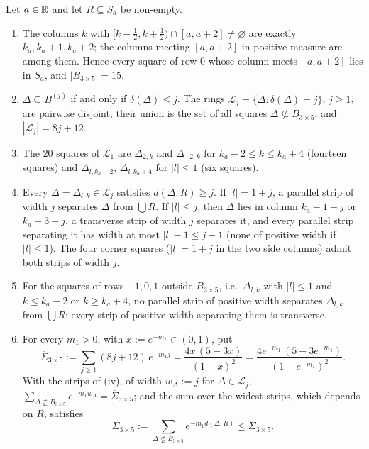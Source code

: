 \begin{auxlemma}\label{aux:notation-rings}
Let $a\in\mathbb{R}$ and let $R\subseteq S_a$ be non-empty.
\begin{enumerate}
\item[\textup{(i)}] The columns $k$ with $[k-\frac12,k+\frac12)\cap[a,a+2]\ne\varnothing$ are
exactly $k_a,k_a+1,k_a+2$; the columns meeting $[a,a+2]$ in positive measure are among
them.  Hence every square of row $0$ whose column meets $[a,a+2]$ lies in $S_a$, and
$|B_{3\times5}|=15$.
\item[\textup{(ii)}] $\Delta\subseteq B^{(j)}$ if and only if $\delta(\Delta)\le j$.  The rings
$\mathcal L_j=\{\Delta:\delta(\Delta)=j\}$, $j\ge1$, are pairwise disjoint, their union is
the set of all squares $\Delta\not\subseteq B_{3\times5}$, and $|\mathcal L_j|=8j+12$.
\item[\textup{(iii)}] The $20$ squares of $\mathcal L_1$ are $\Delta_{2,k}$ and $\Delta_{-2,k}$
for $k_a-2\le k\le k_a+4$ (fourteen squares) and $\Delta_{l,k_a-2}$, $\Delta_{l,k_a+4}$ for
$|l|\le1$ (six squares).
\item[\textup{(iv)}] Every $\Delta=\Delta_{l,k}\in\mathcal L_j$ satisfies $d(\Delta,R)\ge j$.  If
$|l|=1+j$, a parallel strip of width $j$ separates $\Delta$ from $\bigcup R$.  If $|l|\le j$,
then $\Delta$ lies in column $k_a-1-j$ or $k_a+3+j$, a transverse strip of width $j$
separates it, and every parallel strip separating it has width at most $|l|-1\le j-1$ (none
of positive width if $|l|\le1$).  The four corner squares ($|l|=1+j$ in the two side
columns) admit both strips of width $j$.
\item[\textup{(v)}] For the squares of rows $-1,0,1$ outside $B_{3\times5}$, i.e.\
$\Delta_{l,k}$ with $|l|\le1$ and $k\le k_a-2$ or $k\ge k_a+4$, no parallel strip of positive
width separates $\Delta_{l,k}$ from $\bigcup R$: every strip of positive width separating
them is transverse.
\item[\textup{(vi)}] For every $m_1>0$, with $x:=e^{-m_1}\in(0,1)$, put
\[
 \overline\Sigma_{3\times5}:=\sum_{j\ge1}(8j+12)\,e^{-m_1j}=\frac{4x\,(5-3x)}{(1-x)^2}
 =\frac{4e^{-m_1}\,(5-3e^{-m_1})}{(1-e^{-m_1})^2} .
\]
With the strips of \textup{(iv)}, of width $w_\Delta:=j$ for $\Delta\in\mathcal L_j$,
$\sum_{\Delta\not\subseteq B_{3\times5}}e^{-m_1w_\Delta}=\overline\Sigma_{3\times5}$; and the sum
over the widest strips, which depends on $R$, satisfies
\[
 \Sigma_{3\times5}:=\sum_{\Delta\not\subseteq B_{3\times5}}e^{-m_1d(\Delta,R)}
 \le\overline\Sigma_{3\times5} .
\]
\end{enumerate}
\end{auxlemma}

